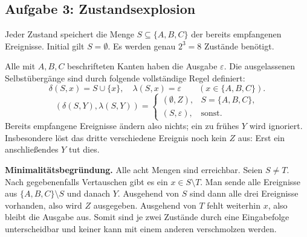 \subsection*{Aufgabe 3: Zustandsexplosion}
Jeder Zustand speichert die Menge $S\subseteq\{A,B,C\}$ der bereits empfangenen Ereignisse. Initial gilt $S=\emptyset$. Es werden genau $2^3=8$ Zustände benötigt.
\begin{center}
\end{center}
Alle mit $A,B,C$ beschrifteten Kanten haben die Ausgabe $\varepsilon$. Die ausgelassenen Selbstübergänge sind durch folgende vollständige Regel definiert:
\[
\delta(S,x)=S\cup\{x\},\quad\lambda(S,x)=\varepsilon
\qquad (x\in\{A,B,C\}).
\]
\[
(\delta(S,Y),\lambda(S,Y))=
\begin{cases}
(\emptyset,Z),&S=\{A,B,C\},\\
(S,\varepsilon),&\text{sonst}.
\end{cases}
\]
Bereits empfangene Ereignisse ändern also nichts; ein zu frühes $Y$ wird ignoriert. Insbesondere löst das dritte verschiedene Ereignis noch kein $Z$ aus: Erst ein anschließendes $Y$ tut dies.

\textbf{Minimalitätsbegründung.} Alle acht Mengen sind erreichbar. Seien $S\neq T$. Nach gegebenenfalls Vertauschen gibt es ein $x\in S\setminus T$. Man sende alle Ereignisse aus $\{A,B,C\}\setminus S$ und danach $Y$. Ausgehend von $S$ sind dann alle drei Ereignisse vorhanden, also wird $Z$ ausgegeben. Ausgehend von $T$ fehlt weiterhin $x$, also bleibt die Ausgabe aus. Somit sind je zwei Zustände durch eine Eingabefolge unterscheidbar und keiner kann mit einem anderen verschmolzen werden.


